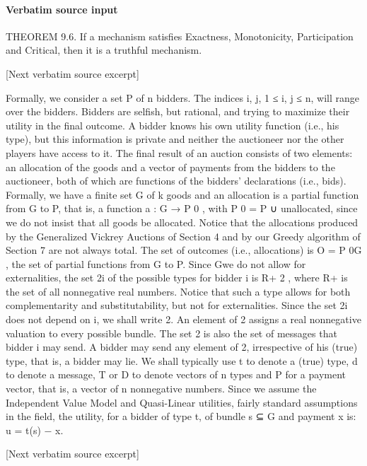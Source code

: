 \documentclass[10pt]{article}
\begin{document}
\paragraph{Verbatim source input}
\begin{ReviewVerbatim}
THEOREM 9.6. If a mechanism satisfies Exactness, Monotonicity, Participation
and Critical, then it is a truthful mechanism.

[Next verbatim source excerpt]

Formally, we consider a set P of n bidders. The indices i, j, 1 ≤ i, j ≤ n, will
range over the bidders. Bidders are selfish, but rational, and trying to maximize their
utility in the final outcome. A bidder knows his own utility function (i.e., his type),
but this information is private and neither the auctioneer nor the other players have
access to it. The final result of an auction consists of two elements: an allocation
of the goods and a vector of payments from the bidders to the auctioneer, both of
which are functions of the bidders’ declarations (i.e., bids). Formally, we have a
finite set G of k goods and an allocation is a partial function from G to P, that is, a
function a : G → P 0 , with P 0 = P ∪ {unallocated}, since we do not insist that all
goods be allocated. Notice that the allocations produced by the Generalized Vickrey
Auctions of Section 4 and by our Greedy algorithm of Section 7 are not always
total. The set of outcomes (i.e., allocations) is O = P 0G , the set of partial functions
from G to P. Since Gwe do not allow for externalities, the set 2i of the possible types
for bidder i is R+ 2 , where R+ is the set of all nonnegative real numbers. Notice
that such a type allows for both complementarity and substitutability, but not for
externalities. Since the set 2i does not depend on i, we shall write 2. An element
of 2 assigns a real nonnegative valuation to every possible bundle. The set 2 is
also the set of messages that bidder i may send. A bidder may send any element of
2, irrespective of his (true) type, that is, a bidder may lie. We shall typically use t
to denote a (true) type, d to denote a message, T or D to denote vectors of n types
and P for a payment vector, that is, a vector of n nonnegative numbers.
Since we assume the Independent Value Model and Quasi-Linear utilities, fairly
standard assumptions in the field, the utility, for a bidder of type t, of bundle s ⊆ G
and payment x is:
u = t(s) − x.

[Next verbatim source excerpt]


\end{ReviewVerbatim}
\end{document}
